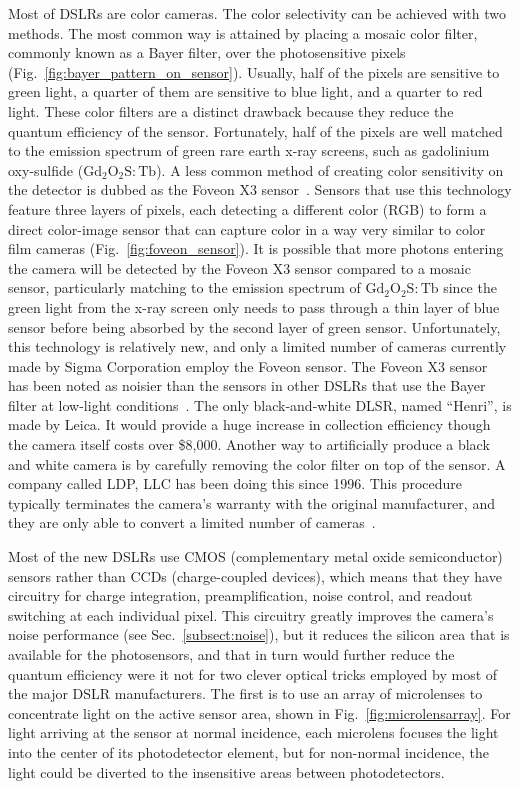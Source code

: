 Most of DSLRs are color cameras.  The color selectivity can be achieved with two methods.  The most common way is attained by placing a mosaic color filter, commonly known as a Bayer filter, over the photosensitive pixels (Fig.~\ref{fig:bayer_pattern_on_sensor}).  Usually, half of the pixels are sensitive to green light, a quarter of them are sensitive to blue light, and a quarter to red light.  These color filters are a distinct drawback because they reduce the quantum efficiency of the sensor.  Fortunately, half of the pixels are well matched to the emission spectrum of green rare earth x-ray screens, such as gadolinium oxy-sulfide ($\mathrm{Gd_2O_2S:Tb}$).  A less common method of creating color sensitivity on the detector is dubbed as the Foveon X3 sensor~\citep{foveon}.  Sensors that use this technology feature three layers of pixels, each detecting a different color (RGB) to form a direct color-image sensor that can capture color in a way very similar to color film cameras (Fig.~\ref{fig:foveon_sensor}).  It is possible that more photons entering the camera will be detected by the Foveon X3 sensor compared to a mosaic sensor, particularly matching to the emission spectrum of $\mathrm{Gd_2O_2S:Tb}$ since the green light from the x-ray screen only needs to pass through a thin layer of blue sensor before being absorbed by the second layer of green sensor.  Unfortunately, this technology is relatively new, and only a limited number of cameras currently made by Sigma Corporation employ the Foveon sensor.  The Foveon X3 sensor has been noted as noisier than the sensors in other DSLRs that use the Bayer filter at low-light conditions~\citep{sigmasd10, stevesdigicams}.  The only black-and-white DLSR, named ``Henri'', is made by Leica.  It would provide a huge increase in collection efficiency though the camera itself costs over \$8,000.  Another way to artificially produce a black and white camera is by carefully removing the color filter on top of the sensor.  A company called LDP, LLC has been doing this since 1996.  This procedure typically terminates the camera's warranty with the original manufacturer, and they are only able to convert a limited number of cameras~\citep{maxmax}.

Most of the new DSLRs use CMOS (complementary metal oxide semiconductor) sensors rather than CCDs (charge-coupled devices), which means that they have circuitry for charge integration, preamplification, noise control, and readout switching at each individual pixel. This circuitry greatly improves the camera's noise performance (see Sec.~\ref{subsect:noise}), but it reduces the silicon area that is available for the photosensors, and that in turn would further reduce the quantum efficiency were it not for two clever optical tricks employed by most of the major DSLR manufacturers. The first is to use an array of microlenses to concentrate light on the active sensor area, shown in Fig.~\ref{fig:microlensarray}. For light arriving at the sensor at normal incidence, each microlens focuses the light into the center of its photodetector element, but for non-normal incidence, the light could be diverted to the insensitive areas between photodetectors.

